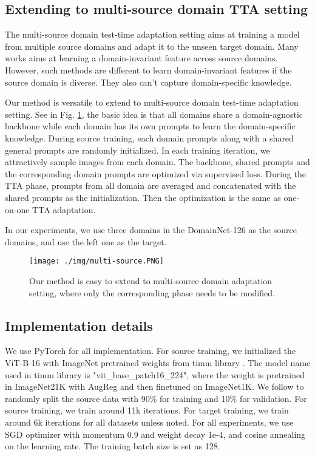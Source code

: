 \documentclass{article} \usepackage{iclr2023_conference,times}
\begin{document}
\subsection{Extending to multi-source domain TTA setting}\label{appendix:multi-source}
The multi-source domain test-time adaptation setting aims at training a model from multiple source domains and adapt it to the unseen target domain. Many works aims at learning a domain-invariant feature across source domains. However, such methods are different to learn domain-invariant features if the source domain is diverse. They also can't capture domain-specific knowledge.

Our method is versatile to extend to multi-source domain test-time adaptation setting. See in Fig. \ref{fig:multi_source}, the basic idea is that all domains share a domain-agnostic backbone while each domain has its own prompts to learn the domain-specific knowledge. During source training, each domain prompts along with a shared general prompts are randomly initialized. In each training iteration, we attractively sample images from each domain. The backbone, shared prompts and the corresponding domain prompts are optimized via supervised loss. During the TTA phase, prompts from all domain are averaged and concatenated with the shared prompts as the initialization. Then the optimization is the same as one-on-one TTA adaptation. 

In our experiments, we use three domains in the DomainNet-126 as the source domains, and use the left one as the target.

\begin{figure}[h]
\begin{center}
\texttt{[image: ./img/multi-source.PNG]}
\end{center}
\caption{Our method is easy to extend to multi-source domain adaptation setting, where only the corresponding phase needs to be modified.  }
\label{fig:multi_source}
\end{figure}

\subsection{Implementation details} We use PyTorch for all implementation. For source training, we initialized the ViT-B-16 with ImageNet pretrained weights from timm library \citep{rw2019timm}. The model name used in timm library is "vit\_base\_patch16\_224", where the weight is pretrained in ImageNet21K with AugReg and then finetuned on ImageNet1K. We follow \citet{chen2022contrastive} to randomly split the source data with 90\% for training and 10\% for validation. For source training, we train around 11k iterations. For target training, we train around 6k iterations for all datasets unless noted. For all experiments, we use SGD optimizer with momentum 0.9 and weight decay 1e-4, and cosine annealing on the learning rate. The training batch size is set as 128.
\end{document}
